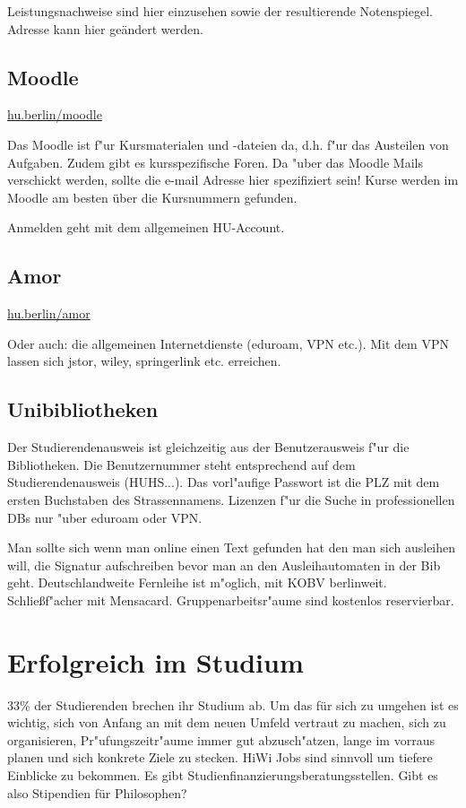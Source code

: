 \documentclass[]{scrartcl}
\begin{document}
Leistungsnachweise sind hier einzusehen sowie der resultierende Notenspiegel. Adresse kann hier geändert werden.

\subsection{Moodle}
\url{hu.berlin/moodle}
\newline

Das Moodle ist f"ur Kursmaterialen und -dateien da, d.h. f"ur das Austeilen von Aufgaben. Zudem gibt es kursspezifische Foren. Da "uber das Moodle Mails verschickt werden, sollte die e-mail Adresse hier spezifiziert sein! Kurse werden im Moodle am besten über die Kursnummern gefunden.

Anmelden geht mit dem allgemeinen HU-Account. 

\subsection{Amor}
\url{hu.berlin/amor}
\newline

Oder auch: die allgemeinen Internetdienste (eduroam, VPN etc.).
Mit dem VPN lassen sich jstor, wiley, springerlink etc. erreichen.

\subsection{Unibibliotheken}

Der Studierendenausweis ist gleichzeitig aus der Benutzerausweis f"ur die Bibliotheken. Die Benutzernummer steht entsprechend auf dem Studierendenausweis (HUHS...). Das vorl"aufige Passwort ist die PLZ mit dem ersten Buchstaben des Strassennamens. Lizenzen f"ur die Suche in professionellen DBs nur "uber eduroam oder VPN.

Man sollte sich wenn man online einen Text gefunden hat den man sich ausleihen will, die Signatur aufschreiben bevor man an den Ausleihautomaten in der Bib geht. Deutschlandweite Fernleihe ist m"oglich, mit KOBV berlinweit. Schließf"acher mit Mensacard. Gruppenarbeitsr"aume sind kostenlos reservierbar.
\newpage


\section{Erfolgreich im Studium}

33\% der Studierenden brechen ihr Studium ab. Um das für sich zu umgehen ist es wichtig, sich von Anfang an mit dem neuen Umfeld vertraut zu machen, sich zu organisieren, Pr"ufungszeitr"aume immer gut abzusch"atzen, lange im vorraus planen und sich konkrete Ziele zu stecken. HiWi Jobs sind sinnvoll um tiefere Einblicke zu bekommen. Es gibt Studienfinanzierungsberatungsstellen. Gibt es also Stipendien für Philosophen?
\end{document}
